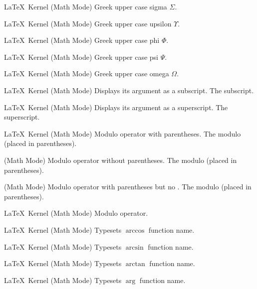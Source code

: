 %
 {}%
 {\LaTeX\ Kernel (Math Mode)}%
 {Greek upper case sigma \ensuremath{\Sigma}.}%
 {}

%
 {}%
 {\LaTeX\ Kernel (Math Mode)}%
 {Greek upper case upsilon \ensuremath{\Upsilon}.}%
 {}

%
 {}%
 {\LaTeX\ Kernel (Math Mode)}%
 {Greek upper case phi \ensuremath{\Phi}.}%
 {}

%
 {}%
 {\LaTeX\ Kernel (Math Mode)}%
 {Greek upper case psi \ensuremath{\Psi}.}%
 {}

%
 {}%
 {\LaTeX\ Kernel (Math Mode)}%
 {Greek upper case omega \ensuremath{\Omega}.}%
 {}

%
 {}%
 {\LaTeX\ Kernel (Math Mode)}%
 {Displays its argument as a subscript.}%
 {%
   \BeginArgList
      The subscript.
   \EndArgList
 }

%
 {}%
 {\LaTeX\ Kernel (Math Mode)}%
 {Displays its argument as a superscript.}%
 {%
   \BeginArgList
      The superscript.
   \EndArgList
 }

%
 {}%
 {\LaTeX\ Kernel (Math Mode)}%
 {Modulo operator with parentheses.}%
 {%
   \BeginArgList
      The modulo (placed in parentheses).
   \EndArgList
 }

%
 {}%
 { (Math Mode)}%
 {Modulo operator without parentheses.}%
 {%
   \BeginArgList
      The modulo (placed in parentheses).
   \EndArgList
 }

%
 {}%
 { (Math Mode)}%
 {Modulo operator with parentheses but no .}%
 {%
   \BeginArgList
      The modulo (placed in parentheses).
   \EndArgList
 }

%
 {}%
 {\LaTeX\ Kernel (Math Mode)}%
 {Modulo operator.}%
 {}

%
 {}%
 {\LaTeX\ Kernel (Math Mode)}%
 {Typesets \ensuremath{\arccos} function name.}%
 {}

%
 {}%
 {\LaTeX\ Kernel (Math Mode)}%
 {Typesets \ensuremath{\arcsin} function name.}%
 {}

%
 {}%
 {\LaTeX\ Kernel (Math Mode)}%
 {Typesets \ensuremath{\arctan} function name.}%
 {}

%
 {}%
 {\LaTeX\ Kernel (Math Mode)}%
 {Typesets \ensuremath{\arg} function name.}%
 {}

